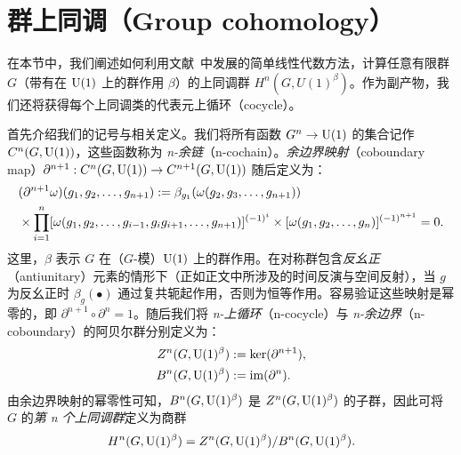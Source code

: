 \section{群上同调（Group cohomology）}\label{sec:GroupCohomology}
在本节中，我们阐述如何利用文献~\cite{Bulmash2020,Vancraeynest2022}中发展的简单线性代数方法，计算任意有限群 $G$（带有在 ${\rm U}(1)$ 上的群作用 $\beta$）的上同调群 $H^n(G,U(1)^\beta)$。作为副产物，我们还将获得每个上同调类的代表元上循环（cocycle）。

\bigskip\noindent 首先介绍我们的记号与相关定义。我们将所有函数 $G^n\rightarrow {\rm U}(1)$ 的集合记作 $C^n(G,{\rm U}(1))$，这些函数称为 \emph{n-余链}（n-cochain）。\emph{余边界映射}（coboundary map）$\partial^{n+1}:C^n(G,{\rm U}(1))\rightarrow C^{n+1}(G,{\rm U}(1))$ 随后定义为：
\begin{equation}
\begin{split}
&(\partial^{n+1}\omega)(g_1,g_2,\dots,g_{n+1}) := \beta_{g_1}(\omega(g_2,g_3,\dots,g_{n+1})) \\
&\hfill\times \prod_{i=1}^n [\omega(g_1,g_2, \dots,g_{i-1},g_ig_{i+1},\dots,g_{n+1})]^{(-1)^i} \times  [\omega(g_1,g_2,\dots,g_n)]^{(-1)^{n + 1}} = 0.
\end{split}
\end{equation}
这里，$\beta$ 表示 $G$ 在（$G$-模）${\rm U}(1)$ 上的群作用。在对称群包含\emph{反幺正}（antiunitary）元素的情形下（正如正文中所涉及的时间反演与空间反射），当 $g$ 为反幺正时 $\beta_g(\bullet)$ 通过复共轭起作用，否则为恒等作用。容易验证这些映射是幂零的，即 $\partial^{n+1}\circ \partial^n = 1$。随后我们将 \emph{n-上循环}（n-cocycle）与 \emph{n-余边界}（n-coboundary）的阿贝尔群分别定义为：
\begin{align}
    Z^n(G,{\rm U}(1)^\beta) &:= \ker(\partial^{n+1}),\\
    B^n(G,{\rm U}(1)^\beta) &:= {\rm im}(\partial^n).
\end{align}
由余边界映射的幂零性可知，$B^n(G,{\rm U}(1)^\beta)$ 是 $Z^n(G,{\rm U}(1)^\beta)$ 的子群，因此可将 $G$ 的\emph{第 n 个上同调群}定义为商群
\begin{equation}
    H^n(G,{\rm U}(1)^\beta) = Z^n(G,{\rm U}(1)^\beta)/B^n(G,{\rm U}(1)^\beta).
\end{equation}

